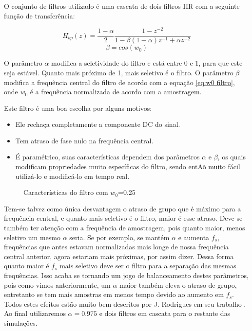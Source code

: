 \indent O conjunto de filtros utilizado é uma cascata de dois filtros IIR com a seguinte função de transferência:

\begin{equation}
H_{bp}(z)=\frac{1-\alpha}{2}\frac{1-z^{-2}}{1-\beta (1-\alpha) z^{-1} + \alpha z^{-2}}
\label{eq:filtro}
\end{equation}
\begin{equation}
\beta=cos(w_0)
\label{eq:w0 filtro}
\end{equation}

\indent O parâmetro $\alpha$ modifica a seletividade do filtro e está entre 0 e 1, para que este seja estável. Quanto mais próximo de 1, mais seletivo é o filtro. O parâmetro $\beta$ modifica a frequência central do filtro de acordo com a equação \ref{eq:w0 filtro}, onde $w_0$ é a frequência normalizada de acordo com a amostragem.

\indent Este filtro é uma boa escolha por alguns motivos:
\begin{itemize}
	\item Ele rechaça completamente a componente DC do sinal.
	\item Tem atraso de fase nulo na frequência central.
	\item É paramétrico, suas características dependem dos parâmetros $\alpha$ e $\beta$, os quais modificam propriedades muito específicas do filtro, sendo entAõ muito fácil utilizá-lo e modificá-lo em tempo real.
\end{itemize}

\begin{figure}[h]
	\centering    
	\def\svgwidth{\columnwidth}
	
	\caption{Características do filtro com $w_0$=0.25}
	\label{fig:your image label}
\end{figure}

\indent Tem-se talvez como única desvantagem o atraso de grupo que é máximo para a frequência central, e quanto mais seletivo é o filtro, maior é esse atraso. Deve-se também ter atenção com a frequência de amostragem, pois quanto maior, menos seletivo um mesmo $\alpha$ seria. Se por exemplo, se mantém $\alpha$ e aumenta $f_s$, frequências que antes estavam normalizadas mais longe de nossa frequência central anterior, agora estariam mais próximas, por assim dizer. Dessa forma quanto maior é $f_s$ mais seletivo deve ser o filtro para a separação das mesmas frequências. Isso acaba se tornando um jogo de balanceamento destes parâmetros, pois como vimos anteriormente, um $\alpha$ maior também eleva o atraso de grupo, entretanto se tem mais amostras em menos tempo devido ao aumento em $f_s$. Todos estes efeitos estão muito bem descritos por J. Rodrigues em seu trabalho \cite{carvalho2008estimaccao}. Ao final utilizaremos $\alpha = 0.975$ e dois filtros em cascata para o restante das simulações.

